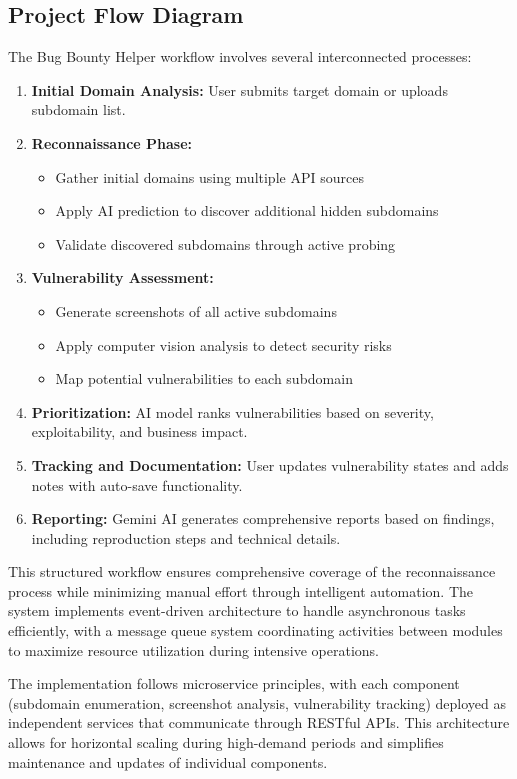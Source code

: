 \documentclass[conference]{IEEEtran}
\begin{document}
\subsection{Project Flow Diagram}
The Bug Bounty Helper workflow involves several interconnected processes:

\begin{enumerate}
    \item \textbf{Initial Domain Analysis:} User submits target domain or uploads subdomain list.
    \item \textbf{Reconnaissance Phase:}
    \begin{itemize}
        \item Gather initial domains using multiple API sources
        \item Apply AI prediction to discover additional hidden subdomains
        \item Validate discovered subdomains through active probing
    \end{itemize}
    \item \textbf{Vulnerability Assessment:}
    \begin{itemize}
        \item Generate screenshots of all active subdomains
        \item Apply computer vision analysis to detect security risks
        \item Map potential vulnerabilities to each subdomain
    \end{itemize}
    \item \textbf{Prioritization:} AI model ranks vulnerabilities based on severity, exploitability, and business impact.
    \item \textbf{Tracking and Documentation:} User updates vulnerability states and adds notes with auto-save functionality.
    \item \textbf{Reporting:} Gemini AI generates comprehensive reports based on findings, including reproduction steps and technical details.
\end{enumerate}

This structured workflow ensures comprehensive coverage of the reconnaissance process while minimizing manual effort through intelligent automation. The system implements event-driven architecture to handle asynchronous tasks efficiently, with a message queue system coordinating activities between modules to maximize resource utilization during intensive operations.

The implementation follows microservice principles, with each component (subdomain enumeration, screenshot analysis, vulnerability tracking) deployed as independent services that communicate through RESTful APIs. This architecture allows for horizontal scaling during high-demand periods and simplifies maintenance and updates of individual components.
\end{document}
